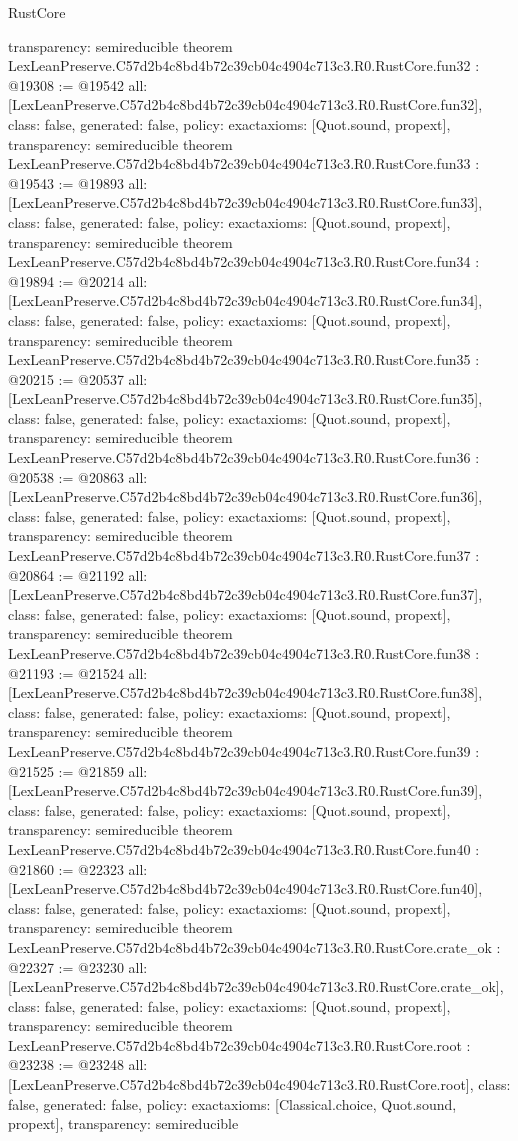 \begin{lexlean}{RustCore}
\begin{coremodule}
{  transparency: semireducible
}
theorem LexLeanPreserve.C57d2b4c8bd4b72c39cb04c4904c713c3.R0.RustCore.fun32 : @19308 := @19542 {
  all: [LexLeanPreserve.C57d2b4c8bd4b72c39cb04c4904c713c3.R0.RustCore.fun32],
  class: false,
  generated: false,
  policy: exact{axioms: [Quot.sound, propext]},
  transparency: semireducible
}
theorem LexLeanPreserve.C57d2b4c8bd4b72c39cb04c4904c713c3.R0.RustCore.fun33 : @19543 := @19893 {
  all: [LexLeanPreserve.C57d2b4c8bd4b72c39cb04c4904c713c3.R0.RustCore.fun33],
  class: false,
  generated: false,
  policy: exact{axioms: [Quot.sound, propext]},
  transparency: semireducible
}
theorem LexLeanPreserve.C57d2b4c8bd4b72c39cb04c4904c713c3.R0.RustCore.fun34 : @19894 := @20214 {
  all: [LexLeanPreserve.C57d2b4c8bd4b72c39cb04c4904c713c3.R0.RustCore.fun34],
  class: false,
  generated: false,
  policy: exact{axioms: [Quot.sound, propext]},
  transparency: semireducible
}
theorem LexLeanPreserve.C57d2b4c8bd4b72c39cb04c4904c713c3.R0.RustCore.fun35 : @20215 := @20537 {
  all: [LexLeanPreserve.C57d2b4c8bd4b72c39cb04c4904c713c3.R0.RustCore.fun35],
  class: false,
  generated: false,
  policy: exact{axioms: [Quot.sound, propext]},
  transparency: semireducible
}
theorem LexLeanPreserve.C57d2b4c8bd4b72c39cb04c4904c713c3.R0.RustCore.fun36 : @20538 := @20863 {
  all: [LexLeanPreserve.C57d2b4c8bd4b72c39cb04c4904c713c3.R0.RustCore.fun36],
  class: false,
  generated: false,
  policy: exact{axioms: [Quot.sound, propext]},
  transparency: semireducible
}
theorem LexLeanPreserve.C57d2b4c8bd4b72c39cb04c4904c713c3.R0.RustCore.fun37 : @20864 := @21192 {
  all: [LexLeanPreserve.C57d2b4c8bd4b72c39cb04c4904c713c3.R0.RustCore.fun37],
  class: false,
  generated: false,
  policy: exact{axioms: [Quot.sound, propext]},
  transparency: semireducible
}
theorem LexLeanPreserve.C57d2b4c8bd4b72c39cb04c4904c713c3.R0.RustCore.fun38 : @21193 := @21524 {
  all: [LexLeanPreserve.C57d2b4c8bd4b72c39cb04c4904c713c3.R0.RustCore.fun38],
  class: false,
  generated: false,
  policy: exact{axioms: [Quot.sound, propext]},
  transparency: semireducible
}
theorem LexLeanPreserve.C57d2b4c8bd4b72c39cb04c4904c713c3.R0.RustCore.fun39 : @21525 := @21859 {
  all: [LexLeanPreserve.C57d2b4c8bd4b72c39cb04c4904c713c3.R0.RustCore.fun39],
  class: false,
  generated: false,
  policy: exact{axioms: [Quot.sound, propext]},
  transparency: semireducible
}
theorem LexLeanPreserve.C57d2b4c8bd4b72c39cb04c4904c713c3.R0.RustCore.fun40 : @21860 := @22323 {
  all: [LexLeanPreserve.C57d2b4c8bd4b72c39cb04c4904c713c3.R0.RustCore.fun40],
  class: false,
  generated: false,
  policy: exact{axioms: [Quot.sound, propext]},
  transparency: semireducible
}
theorem LexLeanPreserve.C57d2b4c8bd4b72c39cb04c4904c713c3.R0.RustCore.crate_ok : @22327 := @23230 {
  all: [LexLeanPreserve.C57d2b4c8bd4b72c39cb04c4904c713c3.R0.RustCore.crate_ok],
  class: false,
  generated: false,
  policy: exact{axioms: [Quot.sound, propext]},
  transparency: semireducible
}
theorem LexLeanPreserve.C57d2b4c8bd4b72c39cb04c4904c713c3.R0.RustCore.root : @23238 := @23248 {
  all: [LexLeanPreserve.C57d2b4c8bd4b72c39cb04c4904c713c3.R0.RustCore.root],
  class: false,
  generated: false,
  policy: exact{axioms: [Classical.choice, Quot.sound, propext]},
  transparency: semireducible
}


\end{coremodule}
\end{lexlean}

